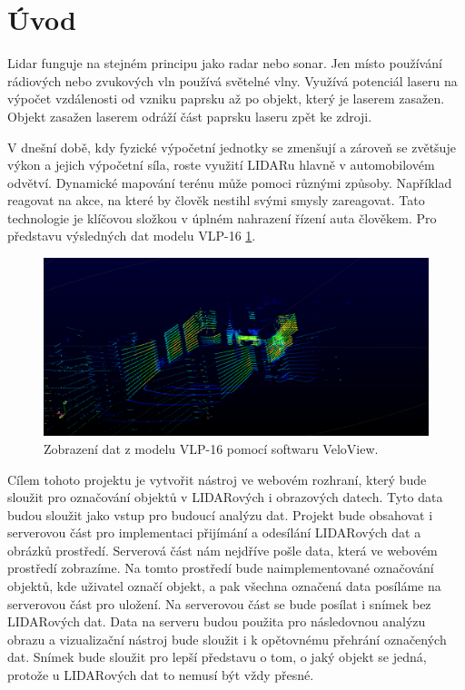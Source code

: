 \documentclass[czech,bachelor,dept420,male,cpdeclaration]{diploma}
\begin{document}
\MakeTitlePages

\lstlistoflistings

\section{Úvod}
Lidar funguje na stejném principu jako radar nebo sonar. Jen místo používání rádiových nebo zvukových vln používá světelné vlny. Využívá potenciál laseru na výpočet vzdálenosti od vzniku paprsku až po objekt, který je laserem zasažen. Objekt zasažen laserem odráží část paprsku laseru zpět ke zdroji. 

V dnešní době, kdy fyzické výpočetní jednotky se zmenšují a zároveň se zvětšuje výkon a jejich výpočetní síla, roste využití LIDARu hlavně v automobilovém odvětví. Dynamické mapování terénu může pomoci různými způsoby. Například reagovat na akce, na které by člověk nestihl svými smysly zareagovat. Tato technologie je klíčovou složkou v úplném nahrazení řízení auta člověkem. Pro představu výsledných dat modelu VLP-16 \ref{fig:lidarexample}. 


\begin{figure}[H]
\includegraphics[width=\linewidth]{Figures/lidar_preview.png}
\caption{Zobrazení dat z modelu VLP-16 pomocí softwaru VeloView. }
\label{fig:lidarexample}
\end{figure}

Cílem tohoto projektu je vytvořit nástroj ve webovém rozhraní, který bude sloužit pro označování objektů v LIDARových i obrazových datech. Tyto data budou sloužit jako vstup pro budoucí analýzu dat. Projekt bude obsahovat i serverovou část pro implementaci přijímání a odesílání LIDARových dat a obrázků prostředí. Serverová část nám nejdříve pošle data, která ve webovém prostředí zobrazíme. Na tomto prostředí bude naimplementované označování objektů, kde uživatel označí objekt, a pak všechna označená data posíláme na serverovou část pro uložení. Na serverovou část se bude posílat i snímek bez LIDARových dat. Data na serveru budou použita pro následovnou analýzu obrazu a vizualizační nástroj bude sloužit i k opětovnému přehrání označených dat. Snímek bude sloužit pro lepší představu o tom, o jaký objekt se jedná, protože u LIDARových dat to nemusí být vždy přesné. 
\end{document}
